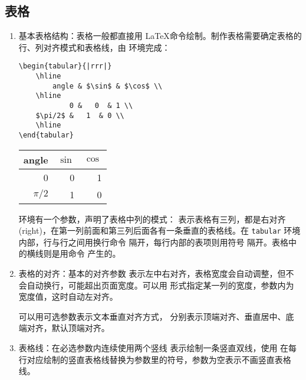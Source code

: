 \subsection{表格}
\begin{enumerate}

\item 基本表格结构：表格一般都直接用 \LaTeX 命令绘制。制作表格需要确定表格的行、列对齐模式和表格线，由  环境完成：

\begin{tcolorbox}[sidebyside]
\begin{lstlisting}
\begin{tabular}{|rrr|}
    \hline
        angle & $\sin$ & $\cos$ \\
    \hline
            0 &   0  & 1 \\
    $\pi/2$ &   1  & 0 \\
    \hline
\end{tabular}
\end{lstlisting} 

\tcblower
\centering
\begin{tabular}{|rrr|}
    \hline
          angle & $\sin$ & $\cos$ \\
    \hline
              0 &   0  & 1 \\
      $\pi / 2$ &   1  & 0 \\
    \hline
\end{tabular}
\end{tcolorbox}

 环境有一个参数，声明了表格中列的模式： 表示表格有三列，都是右对齐(right)，在第一列前面和第三列后面各有一条垂直的表格线。在 \verb|tabular| 环境内部，行与行之间用换行命令 \boxforcmd{\\\\} 隔开，每行内部的表项则用符号 \boxforcmd{&} 隔开。表格中的横线则是用命令 \boxforcmd{\\hline} 产生的。

\item 表格的对齐：基本的对齐参数  表示左中右对齐，表格宽度会自动调整，但不会自动换行，可能超出页面宽度。可以用  形式指定某一列的宽度，参数内为宽度值，这时自动左对齐。

可以用可选参数表示文本垂直对齐方式， 分别表示顶端对齐、垂直居中、底端对齐，默认顶端对齐。

\item 表格线：在必选参数内连续使用两个竖线 \boxforcmd{||} 表示绘制一条竖直双线，使用  在每行对应绘制的竖直表格线替换为参数里的符号，参数为空表示不画竖直表格线。


\end{enumerate}
